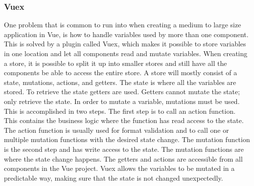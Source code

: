 \subsubsection{Vuex}
One problem that is common to run into when creating a medium to large size application in Vue, is how to handle variables used by more than one component. This is solved by a plugin called Vuex\cite{VUEX}, which makes it possible to store variables in one location and let all components read and mutate variables. When creating a store, it is possible to split it up into smaller stores and still have all the components be able to access the entire store. A store will mostly consist of a state, mutations, actions, and getters. The state is where all the variables are stored. To retrieve the state getters are used. Getters cannot mutate the state; only retrieve the state. In order to mutate a variable, mutations must be used. This is accomplished in two steps. The first step is to call an action function. This contains the business logic where the function has read access to the state. The action function is usually used for format validation and to call one or multiple mutation functions with the desired state change. The mutation function is the second step and has write access to the state. The mutation functions are where the state change happens. The getters and actions are accessible from all components in the Vue project. Vuex allows the variables to be mutated in a predictable way, making sure that the state is not changed unexpectedly.